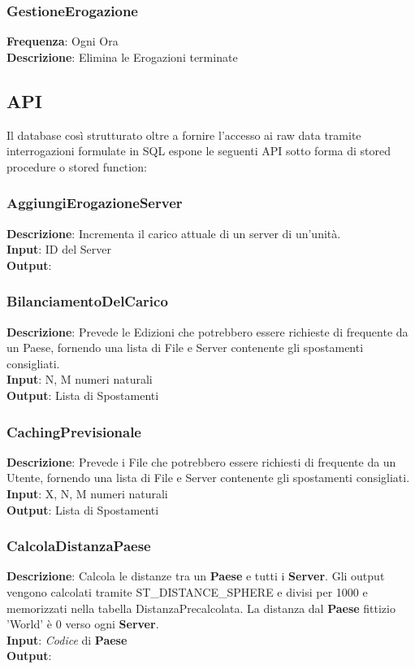 \documentclass{article}
\begin{document}
\subsubsection{GestioneErogazione}
\textbf{Frequenza}: Ogni Ora \\
\textbf{Descrizione}: Elimina le Erogazioni terminate \\
\subsection{API}
Il database così strutturato oltre a fornire l'accesso ai raw data tramite
interrogazioni formulate in SQL espone le seguenti API sotto forma di stored
procedure o stored function:
\subsubsection{AggiungiErogazioneServer}
\textbf{Descrizione}: Incrementa il carico attuale di un server di un'unità.\\
\textbf{Input}: ID del Server\\
\textbf{Output}: \\
\subsubsection{BilanciamentoDelCarico}
\textbf{Descrizione}: Prevede le Edizioni che potrebbero essere richieste di frequente da un Paese, fornendo una lista di File e Server contenente gli spostamenti consigliati.\\
\textbf{Input}: N, M numeri naturali\\
\textbf{Output}: Lista di Spostamenti \\
\subsubsection{CachingPrevisionale}
\textbf{Descrizione}: Prevede i File che potrebbero essere richiesti di frequente da un Utente, fornendo una lista di File e Server contenente gli spostamenti consigliati.\\
\textbf{Input}: X, N, M numeri naturali\\
\textbf{Output}: Lista di Spostamenti \\
\subsubsection{CalcolaDistanzaPaese}
\textbf{Descrizione}: Calcola le distanze tra un \textbf{Paese} e tutti i \textbf{Server}. Gli output vengono calcolati tramite ST\_DISTANCE\_SPHERE e divisi per 1000 e memorizzati nella tabella DistanzaPrecalcolata. La distanza dal \textbf{Paese} fittizio 'World' è 0 verso ogni \textbf{Server}. \\
\textbf{Input}: \textit{Codice} di \textbf{Paese}\\
\textbf{Output}: \\
\end{document}
